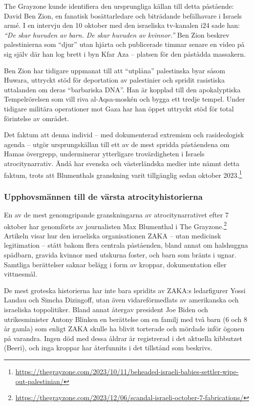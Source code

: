 The Grayzone kunde identifiera den ursprungliga källan till detta påstående: David Ben Zion, en fanatisk bosättarledare och biträdande befälhavare i Israels armé. I en intervju den 10 oktober med den israeliska tv-kanalen i24 sade han: \textit{“De skar huvuden av barn. De skar huvuden av kvinnor.”} Ben Zion beskrev palestinierna som “djur” utan hjärta och publicerade timmar senare en video på sig själv där han log brett i byn Kfar Aza – platsen för den påstådda massakern. 

Ben Zion har tidigare uppmanat till att “utplåna” palestinska byar såsom Huwara, uttryckt stöd för deportation av palestinier och spridit rasistiska uttalanden om deras “barbariska DNA”. Han är kopplad till den apokalyptiska Tempelrörelsen som vill riva al-Aqsa-moskén och bygga ett tredje tempel. Under tidigare militära operationer mot Gaza har han öppet uttryckt stöd för total förintelse av området.

Det faktum att denna individ – med dokumenterad extremism och rasideologisk agenda – utgör ursprungskällan till ett av de mest spridda påståendena om Hamas övergrepp, underminerar ytterligare trovärdigheten i Israels atrocitynarrativ. Ändå har svenska och västerländska medier inte nämnt detta faktum, trots att Blumenthals granskning varit tillgänglig sedan oktober 2023.\footnote{\url{https://thegrayzone.com/2023/10/11/beheaded-israeli-babies-settler-wipe-out-palestinian/}}

\subsubsection*{Upphovsmännen till de värsta atrocityhistorierna}

En av de mest genomgripande granskningarna av atrocitynarrativet efter 7 oktober har genomförts av journalisten Max Blumenthal i The Grayzone.\footnote{\url{https://thegrayzone.com/2023/12/06/scandal-israeli-october-7-fabrications/}} Artikeln visar hur den israeliska organisationen ZAKA – utan medicinsk legitimation – stått bakom flera centrala påståenden, bland annat om halshuggna spädbarn, gravida kvinnor med utskurna foster, och barn som bränts i ugnar. Samtliga berättelser saknar belägg i form av kroppar, dokumentation eller vittnesmål.  

De mest groteska historierna har inte bara spridits av ZAKA:s ledarfigurer Yossi Landau och Simcha Dizingoff, utan även vidareförmedlats av amerikanska och israeliska toppolitiker. Bland annat återgav president Joe Biden och utrikesminister Antony Blinken en berättelse om en familj med två barn (6 och 8 år gamla) som enligt ZAKA skulle ha blivit torterade och mördade inför ögonen på varandra. Ingen död med dessa åldrar är registrerad i det aktuella kibbutzet (Beeri), och inga kroppar har återfunnits i det tillstånd som beskrivs.

